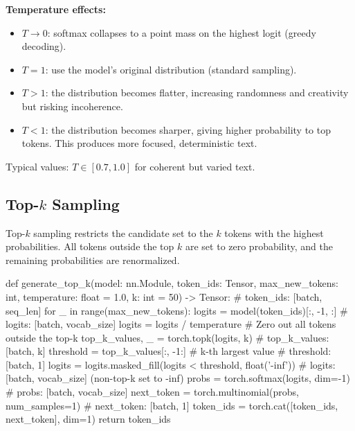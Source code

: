 \begin{keyconcept}
  \textbf{Temperature effects:}
  \begin{itemize}
    \item $T \rightarrow 0$: softmax collapses to a point mass on the highest
          logit (greedy decoding).
    \item $T = 1$: use the model's original distribution (standard sampling).
    \item $T > 1$: the distribution becomes flatter, increasing randomness
          and creativity but risking incoherence.
    \item $T < 1$: the distribution becomes sharper, giving higher probability
          to top tokens. This produces more focused, deterministic text.
  \end{itemize}
  Typical values: $T \in [0.7, 1.0]$ for coherent but varied text.
\end{keyconcept}

\subsection{Top-$k$ Sampling}

Top-$k$ sampling restricts the candidate set to the $k$ tokens with the
highest probabilities. All tokens outside the top $k$ are set to zero
probability, and the remaining probabilities are renormalized.

\begin{pseudocode}
def generate_top_k(model: nn.Module, token_ids: Tensor,
                   max_new_tokens: int, temperature: float = 1.0,
                   k: int = 50) -> Tensor:
    # token_ids: [batch, seq_len]
    for _ in range(max_new_tokens):
        logits = model(token_ids)[:, -1, :]
        # logits: [batch, vocab_size]
        logits = logits / temperature
        # Zero out all tokens outside the top-k
        top_k_values, _ = torch.topk(logits, k)
        # top_k_values: [batch, k]
        threshold = top_k_values[:, -1:]  # k-th largest value
        # threshold: [batch, 1]
        logits = logits.masked_fill(logits < threshold, float('-inf'))
        # logits: [batch, vocab_size]  (non-top-k set to -inf)
        probs = torch.softmax(logits, dim=-1)
        # probs: [batch, vocab_size]
        next_token = torch.multinomial(probs, num_samples=1)
        # next_token: [batch, 1]
        token_ids = torch.cat([token_ids, next_token], dim=1)
    return token_ids
\end{pseudocode}

